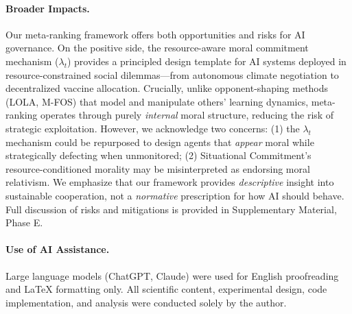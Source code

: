 \documentclass{article}
\begin{document}
\paragraph{Broader Impacts.}
Our meta-ranking framework offers both opportunities and risks for AI governance. On the positive side, the resource-aware moral commitment mechanism ($\lambda_t$) provides a principled design template for AI systems deployed in resource-constrained social dilemmas---from autonomous climate negotiation to decentralized vaccine allocation. Crucially, unlike opponent-shaping methods (LOLA, M-FOS) that model and manipulate others' learning dynamics, meta-ranking operates through purely \textit{internal} moral structure, reducing the risk of strategic exploitation.
However, we acknowledge two concerns: (1) the $\lambda_t$ mechanism could be repurposed to design agents that \textit{appear} moral while strategically defecting when unmonitored; (2) Situational Commitment's resource-conditioned morality may be misinterpreted as endorsing moral relativism. We emphasize that our framework provides \textit{descriptive} insight into sustainable cooperation, not a \textit{normative} prescription for how AI should behave. Full discussion of risks and mitigations is provided in Supplementary Material, Phase E.

\paragraph{Use of AI Assistance.} Large language models (ChatGPT, Claude) were used for English proofreading and LaTeX formatting only. All scientific content, experimental design, code implementation, and analysis were conducted solely by the author.



\end{document}
